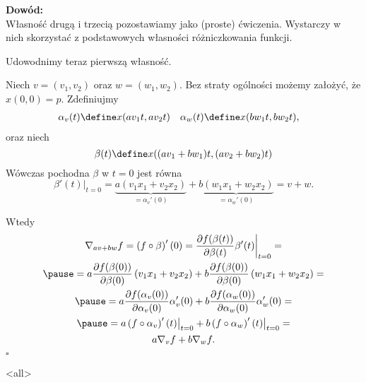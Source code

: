 \begin{frame}[<+->]

\textcolor{ared}{\textbf{Dowód:}}\\\pause 
Własność drugą i trzecią pozostawiamy jako (proste) ćwiczenia. Wystarczy w nich skorzystać z podstawowych własności różniczkowania funkcji.

Udowodnimy teraz pierwszą własność. 

\pause Niech $v=(v_1, v_2)$ oraz $w=(w_1,w_2)$. Bez straty ogólności możemy założyć, że $x(0,0)=p$. \pause Zdefiniujmy 
\begin{align*}
\alpha_v(t)\define&{x(av_1t,av_2t)}& \alpha_w(t)\define &x(bw_1t,bw_2t),
\end{align*}
oraz niech
\[\beta(t)\define x((av_1+bw_1)t,(av_2+bw_2)t)\] %
\pause Wówczas pochodna $\beta$ w $t=0$ jest równa 
\[\beta'(t)\big|_{t=0}=
\underbrace{a(v_1x_1+v_2x_2)}_{=\alpha_v'(0)}+\underbrace{b(w_1x_1+w_2x_2)}_{=\alpha_w'(0)}=v+w.\]

\end{frame}
\begin{frame}[<+->]

Wtedy 
\begin{multline*}
\nabla_{av+bw}f=\left(f\circ \beta\right)'(0)=\frac{\partial f(\beta(t))}{\partial \beta(t)}\beta'(t)\bigg|_{t=0}=\\\pause
=a\frac{\partial f(\beta(0))}{\partial \beta(0)}\left(v_1 x_1+v_2 x_2\right)+b\frac{\partial f(\beta(0))}{\partial \beta(0)}\left(w_1 x_1+w_2 x_2\right)=\\\pause
=a\frac{\partial f(\alpha_v(0))}{\partial \alpha_v(0)}\alpha_v'(0)+b\frac{\partial f(\alpha_w(0))}{\partial \alpha_w(0)}\alpha_w'(0)=\\\pause
=a\left(f\circ \alpha_v\right)'(t)\big|_{t=0}+b\left(f\circ \alpha_w\right)'(t)\big|_{t=0}=\\a\nabla_vf+b\nabla_wf.
\end{multline*}
\hfill $\square$

\end{frame}
\mode<all>{}
